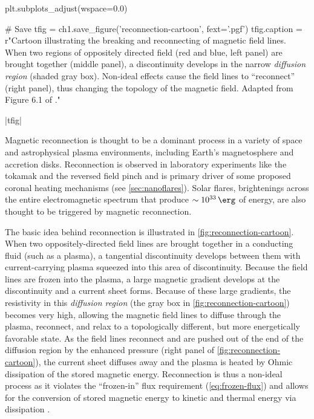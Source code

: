 \begin{pycode}[chapter1]
plt.subplots_adjust(wspace=0.0)

# Save
tfig = ch1.save_figure('reconnection-cartoon', fext='.pgf')
tfig.caption = r"Cartoon illustrating the breaking and reconnecting of magnetic field lines. When two regions of oppositely directed field (red and blue, left panel) are brought together (middle panel), a discontinuity develops in the narrow \textit{diffusion region} (shaded gray box). Non-ideal effects cause the field lines to ``reconnect'' (right panel), thus changing the topology of the magnetic field. Adapted from Figure 6.1 of \citet{priest_magnetohydrodynamics_2014}."
\end{pycode}
\py[chapter1]|tfig|

Magnetic reconnection is thought to be a dominant process in a variety of space and astrophysical plasma environments, including Earth's magnetosphere and accretion disks. Reconnection is observed in laboratory experiments like the tokamak and the reversed field pinch \citep{priest_magnetic_2000} and is primary driver of some proposed coronal heating mechanisms (see \autoref{sec:nanoflares}). Solar flares, brightenings across the entire electromagnetic spectrum that produce $\sim\SI{e33}{\erg}$ of energy, are also thought to be triggered by magnetic reconnection.

The basic idea behind reconnection is illustrated in \autoref{fig:reconnection-cartoon}. When two oppositely-directed field lines are brought together in a conducting fluid (such as a plasma), a tangential discontinuity develops between them with current-carrying plasma squeezed into this area of discontinuity. Because the field lines are frozen into the plasma, a large magnetic gradient develops at the discontinuity and a current sheet forms. Because of these large gradients, the resistivity in this \textit{diffusion region} (the gray box in \autoref{fig:reconnection-cartoon}) becomes very high, allowing the magnetic field lines to diffuse through the plasma, reconnect, and relax to a topologically different, but more energetically favorable state. As the field lines reconnect and are pushed out of the end of the diffusion region by the enhanced pressure (right panel of \autoref{fig:reconnection-cartoon}), the current sheet diffuses away and the plasma is heated by Ohmic dissipation of the stored magnetic energy. Reconnection is thus a non-ideal process as it violates the ``frozen-in'' flux requirement (\autoref{eq:frozen-flux}) and allows for the conversion of stored magnetic energy to kinetic and thermal energy via dissipation \citep{priest_magnetic_2000,priest_magnetohydrodynamics_2014}.

